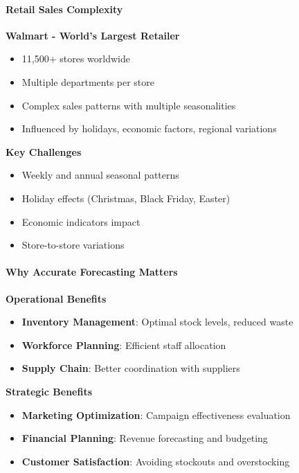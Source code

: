 {
  \framesubtitle{Retail Sales Complexity}
  \begin{figure}[H]
    \centering
   
  \end{figure}

  \textbf{Walmart - World's Largest Retailer}
  \begin{itemize}
    \item 11,500+ stores worldwide \cite{Zhang:2021}
    \item Multiple departments per store
    \item Complex sales patterns with multiple seasonalities
    \item Influenced by holidays, economic factors, regional variations
  \end{itemize}

  \textbf{Key Challenges}
  \begin{itemize}
    \item Weekly and annual seasonal patterns
    \item Holiday effects (Christmas, Black Friday, Easter)
    \item Economic indicators impact
    \item Store-to-store variations
  \end{itemize}
}

{
  \framesubtitle{Why Accurate Forecasting Matters}
  
  \begin{figure}[H]
    \centering
    
  \end{figure}

  \textbf{Operational Benefits}
  \begin{itemize}
    \item \textbf{Inventory Management}: Optimal stock levels, reduced waste
    \item \textbf{Workforce Planning}: Efficient staff allocation
    \item \textbf{Supply Chain}: Better coordination with suppliers
  \end{itemize}

  \textbf{Strategic Benefits}
  \begin{itemize}
    \item \textbf{Marketing Optimization}: Campaign effectiveness evaluation
    \item \textbf{Financial Planning}: Revenue forecasting and budgeting
    \item \textbf{Customer Satisfaction}: Avoiding stockouts and overstocking
  \end{itemize}
}

